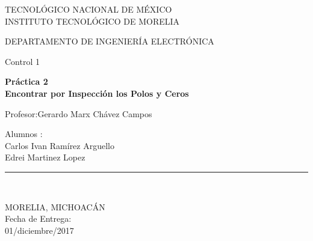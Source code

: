 \documentclass[12pt]{report}
\begin{document}
\begin{titlepage}
\begin{center}
			TECNOLÓGICO NACIONAL DE MÉXICO\\
			\vspace*{0.15in}
			INSTITUTO TECNOLÓGICO DE MORELIA \\
			\vspace*{0.3in}
			\begin{large}
				DEPARTAMENTO DE INGENIERÍA ELECTRÓNICA\\
			\end{large}
			\vspace*{0.2in}
			\begin{large}
				Control 1\\
			\end{large}
		\vspace*{0.3in}
			\begin{Large}
				\textbf{Práctica 2\\
				Encontrar por Inspección los Polos y Ceros} \\
			\end{Large}
			\vspace*{0.3in}
			\begin{large}
			Profesor:Gerardo Marx Chávez Campos\\
			\end{large}
			\vspace*{0.2in}
		\begin{large}
			Alumnos : \\
			Carlos Ivan Ramírez Arguello\\
			Edrei Martinez Lopez\\
		\end{large}
			\vspace*{0.3in}
			\rule{80mm}{0.1mm}\\
			\vspace*{0.1in}
			\begin{large}
				MORELIA, MICHOACÁN \\
				Fecha de Entrega:\\
				01/diciembre/2017 \\
			\end{large}
		\end{center}
	\end{titlepage}
\end{document}
